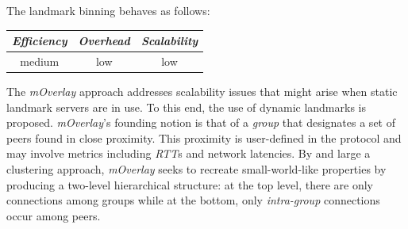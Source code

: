 %
The landmark binning behaves as follows:
\begin{center}
{\footnotesize
\begin{tabular}{ccc}
\emph{Efficiency} & \emph{Overhead} & \emph{Scalability} \\
\hline
medium &
low &
low
\end{tabular}
}
\end{center}

The \emph{mOverlay} \cite{ZZZSZ2004} approach addresses scalability issues
that might arise when static landmark servers are in use.
To this end, the use of dynamic landmarks is proposed.
\emph{mOverlay}'s founding notion is that of a \emph{group} that 
designates a set of peers found in close proximity.
This proximity is user-defined in the protocol and 
may involve metrics including \emph{RTT}s and network latencies.
By and large a clustering approach, \emph{mOverlay} seeks to 
recreate small-world-like properties by producing a 
two-level hierarchical structure:
at the top level, there are only connections among groups 
while at the bottom, only \emph{intra-group} connections occur among peers.

